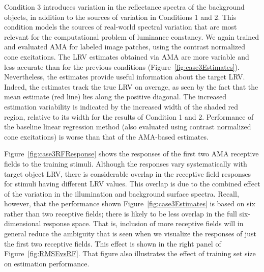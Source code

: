 \documentclass{jov}
\begin{document}
Condition 3 introduces variation in the reflectance spectra of the background objects, in addition to the sources of variation in Conditions 1 and 2.
This condition models the sources of real-world spectral variation that are most relevant for the computational problem of luminance constancy.
We again trained and evaluated AMA for labeled image patches, using the contrast normalized cone excitations.
The LRV estimates obtained via AMA are more variable and less accurate than for the previous conditions (Figure~\ref{fig:case3Estimates}).
Nevertheless, the estimates provide useful information about the target LRV.
Indeed, the estimates track the true LRV on average, as seen by the fact that the mean estimate (red line) lies along the positive diagonal.
The increased estimation variability is indicated by the increased width of the shaded red region, relative to its width for the results of Condition 1 and 2.
Performance of the baseline linear regression method (also evaluated using contrast normalized cone excitations) is worse than that of the AMA-based estimates.

Figure~\ref{fig:case3RFResponse} shows the responses of the first two AMA receptive fields to the training stimuli.
Although the responses vary systematically with target object LRV, there is considerable overlap in the receptive field responses for stimuli having different LRV values.
This overlap is due to the combined effect of the variation in the illumination and background surface spectra.
Recall, however, that the performance shown Figure~\ref{fig:case3Estimates} is based on six rather than two receptive fields;
there is likely to be less overlap in the full six-dimensional response space.
That is, inclusion of more receptive fields will in general reduce the ambiguity that is seen when we visualize the responses of just the first two receptive fields.
This effect is shown in the right panel of Figure~\ref{fig:RMSEvsRF}.
That figure also illustrates the effect of training set size on estimation performance. 
\end{document}
